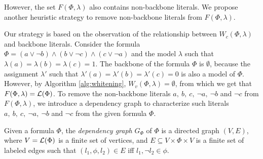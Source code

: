 However, the set $F(\Phi,\lambda)$ also contains non-backbone literals. We propose another heuristic strategy to remove non-backbone literals from $F(\Phi,\lambda)$.

Our strategy is based on the observation of the relationship between $W_c(\Phi,\lambda)$ and backbone literals.
Consider the formula $\Phi=(a\vee\neg b)\wedge(b\vee\neg c)\wedge(c\vee\neg a)$ and the model $\lambda$ such that $\lambda(a)=\lambda(b)=\lambda(c)=1$. The backbone of the formula $\Phi$ is $\emptyset$, because the assignment $\lambda'$ such that $\lambda'(a)=\lambda'(b)=\lambda'(c)=0$ is also a model of $\Phi$.
However, by Algorithm \ref{alg:whitening},
$W_v(\Phi,\lambda)=\emptyset$, from which we get that $F(\Phi,\lambda)={\cal L}(\Phi)$. To remove the non-backbone literals $a, \ b, \ c, \ \neg a, \ \neg b$ and  $\neg c$
from $F(\Phi,\lambda)$,  we introduce a dependency graph to characterize such literals $a, \ b, \ c, \ \neg a, \ \neg b$ and  $\neg c$ from  the given formula $\Phi$.


Given a formula $\Phi$, the \emph{dependency graph} $G_\Phi$ of $\Phi$ is a directed graph $(V,E)$, where
$V={\cal L}(\Phi)$ is a finite set of vertices, and $E\subseteq V\times \Phi\times V$ is a finite set of labeled edges such that
$(l_1,\phi, l_2)\in E$ iff $l_1,\neg l_2\in \phi$.

